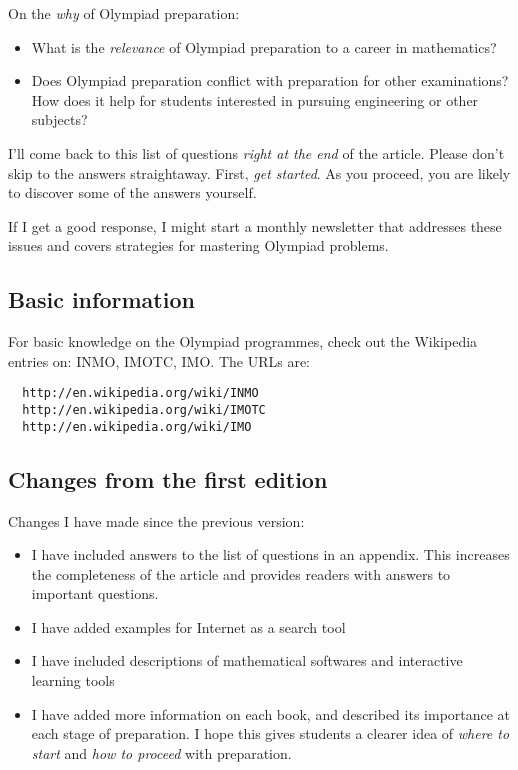 \documentclass[a4paper]{amsart}
\begin{document}
On the {\em why} of Olympiad preparation:

\begin{itemize}

\item What is the {\em relevance} of Olympiad preparation to a career in mathematics?

\item Does Olympiad preparation conflict with preparation for other examinations? How does it help for students interested
  in pursuing engineering or other subjects?

\end{itemize}

I'll come back to this list of questions {\em right at the end} of the
article.  Please don't skip to the answers straightaway. First, {\em
  get started}. As you proceed, you are likely to discover some of the
answers yourself.

If I get a good response, I might start a monthly newsletter that addresses these issues and covers strategies for mastering
Olympiad problems.

\subsection{Basic information}

For basic knowledge on the Olympiad programmes, check out the Wikipedia entries on: INMO, IMOTC, IMO. The URLs are:

\begin{verbatim}
  http://en.wikipedia.org/wiki/INMO
  http://en.wikipedia.org/wiki/IMOTC
  http://en.wikipedia.org/wiki/IMO
\end{verbatim}

\subsection{Changes from the first edition}

Changes I have made since the previous version:

\begin{itemize}

\item I have included answers to the list of questions %
  in an appendix. This increases the completeness of the article and provides readers with answers to important questions.

\item I have added examples for Internet as a search tool

\item I have included descriptions of mathematical softwares and interactive learning tools

\item I have added more information on each book, and described its importance at each stage of preparation.
  I hope this gives students a clearer idea of {\em where to start} and {\em how to proceed} with preparation.

\end{itemize}
\end{document}
